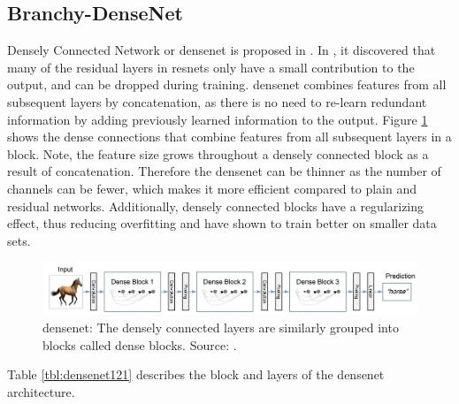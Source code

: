 \newpage\subsection{Branchy-DenseNet}

Densely Connected Network or \gls{densenet} is proposed in \cite{huang_densely_2016}. In \cite{huang_densely_2016}, it discovered that many of the residual layers in \gls{resnet}s only have a small contribution to the output, and can be dropped during training. \gls{densenet} combines features from all subsequent layers by concatenation, as there is no need to re-learn redundant information by adding previously learned information to the output. Figure \ref{fig:densenet} shows the dense connections that combine features from all subsequent layers in a block. Note, the feature size grows throughout a densely connected block as a result of concatenation. Therefore the \gls{densenet} can be thinner as the number of channels can be fewer, which makes it more efficient compared to plain and residual networks. Additionally, densely connected blocks have a regularizing effect, thus reducing overfitting and have shown to train better on smaller data sets.

\begin{figure}
	\centering
	\includegraphics[width=\linewidth]{figures/models/densenet}
	\caption[\gls{densenet}]{\gls{densenet}: The densely connected layers are similarly grouped into blocks called dense blocks. Source:  \cite{huang_densely_2016}.}
	\label{fig:densenet}
\end{figure}

Table \ref{tbl:densenet121} describes the block and layers of the \gls{densenet} architecture. 

